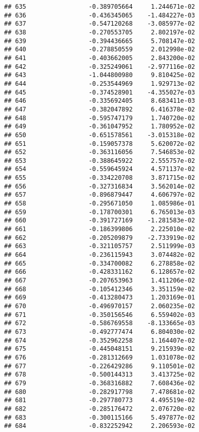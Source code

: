 \documentclass[
]{article}
\begin{document}
\begin{verbatim}
## 635                 -0.389705664     1.244671e-02
## 636                 -0.436345065    -1.484227e-03
## 637                 -0.547120268    -3.085977e-02
## 638                 -0.270553705     2.802197e-02
## 639                 -0.394436665     5.708147e-02
## 640                 -0.278850559     2.012998e-02
## 641                 -0.403662005     2.843200e-02
## 642                 -0.325249061    -2.977116e-02
## 643                 -1.044800980     9.810425e-02
## 644                 -0.253544969     1.929713e-02
## 645                 -0.374528901    -4.355027e-03
## 646                 -0.335692405     8.683411e-03
## 647                 -0.382047892     6.416378e-02
## 648                 -0.595747179     1.740720e-02
## 649                 -0.361047952     1.780952e-02
## 650                 -0.651578561    -3.015318e-02
## 651                 -0.159057378     5.620072e-02
## 652                 -0.363116056     7.546853e-02
## 653                 -0.388645922     2.555757e-02
## 654                 -0.559645924     4.571137e-02
## 655                 -0.334220708     3.871715e-02
## 656                 -0.327316834     3.562014e-02
## 657                 -0.896879447     4.606797e-02
## 658                 -0.295671050     1.085986e-01
## 659                 -0.178700301     6.765013e-03
## 660                 -0.391727169    -1.281583e-02
## 661                 -0.186399806     2.225010e-02
## 662                 -0.205209879    -2.733919e-02
## 663                 -0.321105757     2.511999e-03
## 664                 -0.236115943     3.074482e-02
## 665                 -0.334700082     6.278858e-02
## 666                 -0.428331162     6.128657e-02
## 667                 -0.207653963     1.411206e-02
## 668                 -0.105412346     3.351159e-02
## 669                 -0.413280473     1.203169e-01
## 670                 -0.496970157     2.060235e-02
## 671                 -0.350156546     6.559402e-03
## 672                 -0.586769558    -8.133665e-03
## 673                 -0.492777474     6.804030e-02
## 674                 -0.352962258     1.164407e-02
## 675                 -0.445048151     9.215939e-02
## 676                 -0.281312669     1.031078e-02
## 677                 -0.226429286     9.110501e-02
## 678                 -0.500144313     3.413725e-02
## 679                 -0.368316882     7.608436e-02
## 680                 -0.282917798     7.478681e-02
## 681                 -0.297780773     4.495519e-02
## 682                 -0.285176472     2.076720e-02
## 683                 -0.300115166     5.497877e-02
## 684                 -0.832252942     2.206593e-02

\end{verbatim}
\end{document}
